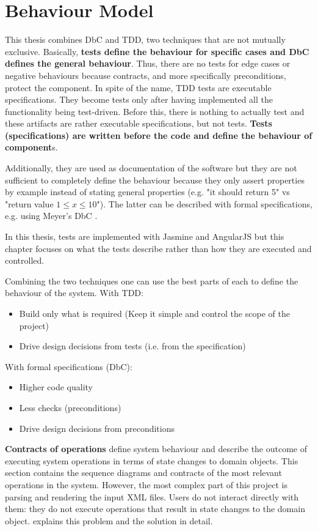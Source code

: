 \FloatBarrier

\section{Behaviour Model}
This thesis combines \ac{DbC} and \ac{TDD}, two techniques that are not mutually exclusive.
Basically, \textbf{tests define the behaviour for specific cases and \ac{DbC} defines the general behaviour}. 
Thus, there are no tests for edge cases or negative behaviours because contracts, and more specifically preconditions, protect the component.
In spite of the name, \ac{TDD} tests are executable specifications.
They become tests only after having implemented all the functionality being test-driven.
Before this, there is nothing to actually test and these artifacts are rather executable specifications, but not tests.
\textbf{Tests (specifications) are written before the code and define the behaviour of component}s.

Additionally, they are used as documentation of the software but they are not sufficient to completely define the behaviour because they only assert properties by example instead of stating general properties (e.g. "it should return 5" vs "return value $1 \leq x \leq 10$"). The latter can be described with formal specifications, e.g. using Meyer's \ac{DbC} \cite{Baumeister:2004}.

In this thesis, tests are implemented with Jasmine and AngularJS but this chapter focuses on what the tests describe rather than how they are executed and controlled.

Combining the two techniques one can use the best parts of each to define the behaviour of the system.
With \ac{TDD}:
\begin{itemize}
    \item Build only what is required (Keep it simple and control the scope of the project)
    \item Drive design decisions from tests (i.e. from the specification)
\end{itemize}

\noindent With formal specifications (\ac{DbC}):
\begin{itemize}
    \item Higher code quality
    \item Less checks (preconditions)
    \item Drive design decisions from preconditions
\end{itemize}


\textbf{Contracts of operations} define system behaviour and describe the outcome of executing system operations in terms of state changes to domain objects.
This section contains the sequence diagrams and contracts of the most relevant operations in the system.
However, the most complex part of this project is parsing and rendering the input \ac{XML} files.
Users do not interact directly with them: they do not execute operations that result in state changes to the domain object.
 explains this problem and the solution in detail.

